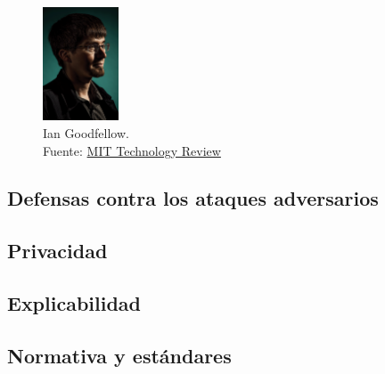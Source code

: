 \begin{figure}[H]
  \centering
  \includegraphics[width=0.2\textwidth]{figures/gan-goodfellow.png}
  \caption{Ian Goodfellow. \\Fuente: \href{https://www.technologyreview.es/s/10016/el-senor-de-las-gan-el-hombre-que-dio-imaginacion-las-maquinas}{MIT Technology Review}}
  \label{fig:gan-ian-goodfellow}
\end{figure}



\subsection{Defensas contra los ataques adversarios}

\subsection{Privacidad}

\subsection{Explicabilidad}

\subsection{Normativa y estándares}










